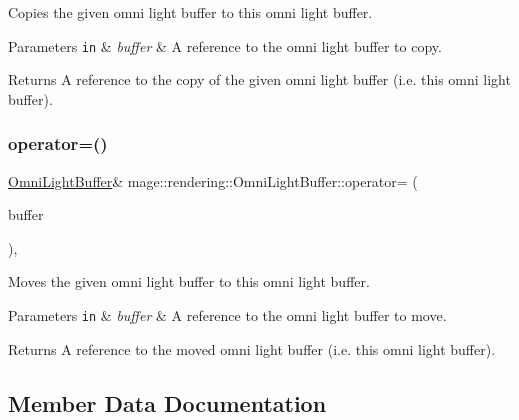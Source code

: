 Copies the given omni light buffer to this omni light buffer.


\begin{DoxyParams}[1]{Parameters}
\mbox{\tt in}  & {\em buffer} & A reference to the omni light buffer to copy. \\
\hline
\end{DoxyParams}
\begin{DoxyReturn}{Returns}
A reference to the copy of the given omni light buffer (i.\+e. this omni light buffer). 
\end{DoxyReturn}
\hypertarget{structmage_1_1rendering_1_1_omni_light_buffer_a5dc568c33ce2343aaf76c82aaaffa921}{}\label{structmage_1_1rendering_1_1_omni_light_buffer_a5dc568c33ce2343aaf76c82aaaffa921} 
\subsubsection{\texorpdfstring{operator=()}{operator=()}\hspace{0.1cm}{\footnotesize\ttfamily [2/2]}}
{\footnotesize\ttfamily \hyperlink{structmage_1_1rendering_1_1_omni_light_buffer}{Omni\+Light\+Buffer}\& mage\+::rendering\+::\+Omni\+Light\+Buffer\+::operator= (\begin{DoxyParamCaption}\item[{\hyperlink{structmage_1_1rendering_1_1_omni_light_buffer}{Omni\+Light\+Buffer} \&\&}]{buffer }\end{DoxyParamCaption})\hspace{0.3cm}{\ttfamily [default]}, {\ttfamily [noexcept]}}

Moves the given omni light buffer to this omni light buffer.


\begin{DoxyParams}[1]{Parameters}
\mbox{\tt in}  & {\em buffer} & A reference to the omni light buffer to move. \\
\hline
\end{DoxyParams}
\begin{DoxyReturn}{Returns}
A reference to the moved omni light buffer (i.\+e. this omni light buffer). 
\end{DoxyReturn}


\subsection{Member Data Documentation}
\hypertarget{structmage_1_1rendering_1_1_omni_light_buffer_a01b8cc152dd0ea2b961448ad3057a5d0}{}\label{structmage_1_1rendering_1_1_omni_light_buffer_a01b8cc152dd0ea2b961448ad3057a5d0} 
